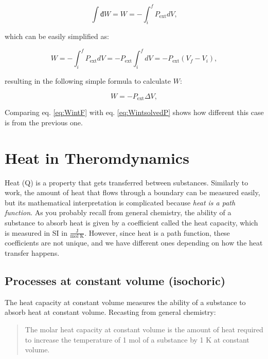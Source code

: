 \documentclass[
]{book}
\theoremstyle{definition}
\theoremstyle{definition}
\theoremstyle{definition}
\theoremstyle{remark}
\begin{document}
\begin{equation}
  \int đ W = W = - \int_{i}^{f} P_{\text{ext}}dV,
  \label{eq:Wint2}
\end{equation}

which can be easily simplified as:

\begin{equation}
  W = - \int_{i}^{f} P_{\text{ext}}dV = -P_{\text{ext}} \int_{i}^{f} dV = -P_{\text{ext}} (V_f-V_i),
  \label{eq:Wint3}
\end{equation}

resulting in the following simple formula to calculate \(W\):

\begin{equation}
  W = -P_{\text{ext}} \Delta V,
  \label{eq:WintF}
\end{equation}

Comparing eq. \eqref{eq:WintF} with eq. \eqref{eq:WintsolvedP} shows how different this case is from the previous one.

\hypertarget{heatint}{%
\section{Heat in Theromdynamics}\label{heatint}}

Heat (Q) is a property that gets transferred between substances. Similarly to work, the amount of heat that flows through a boundary can be measured easily, but its mathematical interpretation is complicated because \emph{heat is a path function}.
As you probably recall from general chemistry, the ability of a substance to absorb heat is given by a coefficient called the heat capacity, which is measured in SI in \(\frac{\text{J}}{\text{mol K}}\). However, since heat is a path function, these coefficients are not unique, and we have different ones depending on how the heat transfer happens.

\hypertarget{processes-at-constant-volume-isochoric}{%
\subsection{Processes at constant volume (isochoric)}\label{processes-at-constant-volume-isochoric}}

The heat capacity at constant volume measures the ability of a substance to absorb heat at constant volume. Recasting from general chemistry:

\begin{quote}
The molar heat capacity at constant volume is the amount of heat required to increase the temperature of 1 mol of a substance by 1 K at constant volume.
\end{quote}
\end{document}
